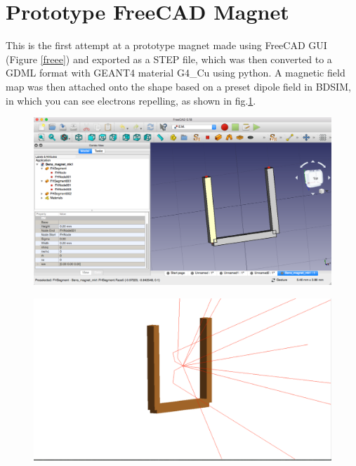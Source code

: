 \documentclass[12pt,a4paper]{article}
\begin{document}
\small


\section{Prototype FreeCAD Magnet}
\label{mag}
This is the first attempt at a prototype magnet made using FreeCAD GUI (Figure \ref{freee}) and exported as a STEP file, which was then converted to a GDML format with GEANT4 material G4\_Cu using python. A magnetic field map was then attached onto the shape based on a preset dipole field in BDSIM, in which you can see electrons repelling, as shown in fig.\ref{repel}.

\begin{figure}[h!]
\centering
\begin{minipage}{.5\textwidth}
  \centering
  \includegraphics[height=0.5\linewidth]{Images//CAD_Mag//maginfreeCAD.png}
  \label{freee}
\end{minipage}%
\begin{minipage}{.5\textwidth}
  \centering
  \includegraphics[height=.5\linewidth]{Images//CAD_Mag//maginbdsim.png}
  \label{repel}
\end{minipage}%
\end{figure}
\end{document}
